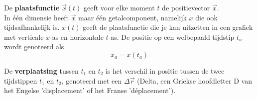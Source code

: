 \documentclass{ximera}
\begin{document}
\begin{definition} 
	De \textbf{plaatsfunctie} \(\vec{x}(t)\) geeft voor elke moment \(t\) de positievector \(\vec{x}\). \\
	In één dimensie heeft \(\vec{x}\) maar één getalcomponent, namelijk \(x\) die ook tijdsafhankelijk is. 
	\(x(t)\) geeft de plaatsfunctie die je kan uitzetten in een grafiek met verticale \(x\)-as en horizontale \(t\)-as. 
	De positie op een welbepaald tijdstip \(t_a\) wordt genoteerd als 
	\[
	x_a = x(t_a)
	\]

\begin{image}[0.3\textwidth]
\end{image}

\end{definition}



De \textbf{verplaatsing} tussen $t_1$ en $t_2$ is het verschil in positie tussen de twee tijdstippen $t_1$ en $t_2$, genoteerd met een $\Delta$\(\vec{r}\) (Delta, een Griekse hoofdletter D  van het Engelse 'displacement' of het Franse 'déplacement').
\end{document}
